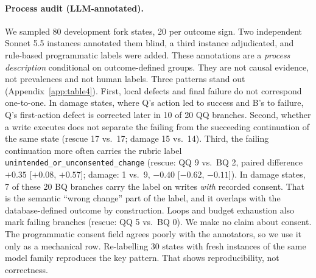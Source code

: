 \paragraph{Process audit (LLM-annotated).} We sampled 80 development fork states, 20 per outcome sign. %
 Two independent Sonnet 5.5 instances annotated them blind, a third instance adjudicated, and rule-based programmatic labels were added. These annotations are a \emph{process description} conditional on outcome-defined groups. They are not causal evidence, not prevalences and not human labels. Three patterns stand out (Appendix~\ref{app:table4}). First, local defects and final failure do not correspond one-to-one. In damage states, where Q's action led to success and B's to failure, Q's first-action defect is corrected later in 10 of 20 QQ branches. Second, whether a write executes does not separate the failing from the succeeding continuation of the same state (rescue 17 vs.\ 17; damage 15 vs.\ 14). Third, the failing continuation more often carries the rubric label \texttt{unintended\_or\_unconsented\_change} (rescue: QQ 9 vs.\ BQ 2, paired difference $+0.35$ [$+0.08$, $+0.57$]; damage: 1 vs.\ 9, $-0.40$ [$-0.62$, $-0.11$]). In damage states, 7 of these 20 BQ branches carry the label on writes \emph{with} recorded consent. That is the semantic ``wrong change'' part of the label, and it overlaps with the database-defined outcome by construction. Loops and budget exhaustion also mark failing branches (rescue: QQ 5 vs.\ BQ 0). %
We make no claim about consent. The programmatic consent field agrees poorly with the annotators, so we use it only as a mechanical row. Re-labelling 30 states with fresh instances of the same model family reproduces the key pattern. That shows reproducibility, not correctness. %
